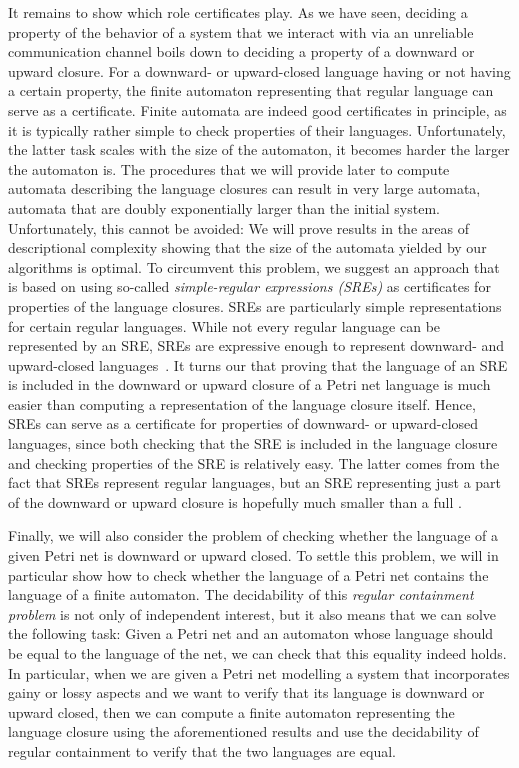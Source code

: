 \documentclass[../../diss.tex]{subfiles}
\begin{document}
It remains to show which role certificates play.
As we have seen, deciding a property of the behavior of a system that we interact with via an unreliable communication channel boils down to deciding a property of a downward or upward closure.
For a downward- or upward-closed language having or not having a certain property, the finite automaton representing that regular language can serve as a certificate.
Finite automata are indeed good certificates in principle, as it is typically rather simple to check properties of their languages.
Unfortunately, the latter task scales with the size of the automaton, \ie it becomes harder the larger the automaton is.
The procedures that we will provide later to compute automata describing the language closures can result in very large automata, \eg automata that are doubly exponentially larger than the initial system.
Unfortunately, this cannot be avoided:
We will prove results in the areas of descriptional complexity showing that the size of the automata yielded by our algorithms is optimal.
%
To circumvent this problem, we suggest an approach that is based on using so-called \emph{simple-regular expressions (SREs)} as certificates for properties of the language closures.
SREs are particularly simple representations for certain regular languages.
While not every regular language can be represented by an SRE, SREs are expressive enough to represent downward- and upward-closed languages~\cite{AbdullaCBJ04}.
It turns our that proving that the language of an SRE is included in the downward or upward closure of a Petri net language is much easier than computing a representation of the language closure itself.
Hence, SREs can serve as a certificate for properties of downward- or upward-closed languages, since both checking that the SRE is included in the language closure and checking properties of the SRE is relatively easy.
The latter comes from the fact that SREs represent regular languages, but an SRE representing just a part of the downward or upward closure is hopefully much smaller than a full .

Finally, we will also consider the problem of checking whether the language of a given Petri net is downward or upward closed.
To settle this problem, we will in particular show how to check whether the language of a Petri net contains the language of a finite automaton.
The decidability of this \emph{regular containment problem} is not only of independent interest, but it also means that we can solve the following task:
Given a Petri net and an automaton whose language should be equal to the language of the net, we can check that this equality indeed holds.
In particular, when we are given a Petri net modelling a system that incorporates gainy or lossy aspects and we want to verify that its language is downward or upward closed, then we can compute a finite automaton representing the language closure using the aforementioned results and use the decidability of regular containment to verify that the two languages are equal.
\end{document}
